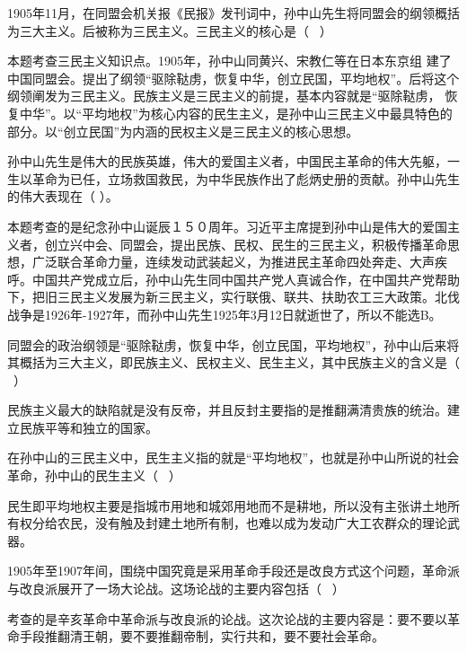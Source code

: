 \question 1905年11月，在同盟会机关报《民报》发刊词中，孙中山先生将同盟会的纲领概括为三大主义。后被称为三民主义。三民主义的核心是（
~）
\par{}
\begin{solution}本题考查三民主义知识点。1905年，孙中山同黄兴、宋教仁等在日本东京组
建了中国同盟会。提出了纲领``驱除鞑虏，恢复中华，创立民国，平均地权''。后将这个纲领阐发为三民主义。民族主义是三民主义的前提，基本内容就是``驱除鞑虏，
恢复中华''。以``平均地权''为核心内容的民生主义，是孙中山三民主义中最具特色的部分。以``创立民国''为内涵的民权主义是三民主义的核心思想。
\end{solution}
\question 孙中山先生是伟大的民族英雄，伟大的爱国主义者，中国民主革命的伟大先躯，一生以革命为已任，立场救国救民，为中华民族作出了彪炳史册的贡献。孙中山先生的伟大表现在（
）。
\par{}
\begin{solution}本题考查的是纪念孙中山诞辰１５０周年。习近平主席提到孙中山是伟大的爱国主义者，创立兴中会、同盟会，提出民族、民权、民生的三民主义，积极传播革命思想，广泛联合革命力量，连续发动武装起义，为推进民主革命四处奔走、大声疾呼。中国共产党成立后，孙中山先生同中国共产党人真诚合作，在中国共产党帮助下，把旧三民主义发展为新三民主义，实行联俄、联共、扶助农工三大政策。北伐战争是1926年-1927年，而孙中山先生1925年3月12日就逝世了，所以不能选B。
\end{solution}
\question 同盟会的政治纲领是``驱除鞑虏，恢复中华，创立民国，平均地权''，孙中山后来将其概括为三大主义，即民族主义、民权主义、民生主义，其中民族主义的含义是（
~）
\par{}
\begin{solution}民族主义最大的缺陷就是没有反帝，并且反封主要指的是推翻满清贵族的统治。建立民族平等和独立的国家。
\end{solution}
\question 在孙中山的三民主义中，民生主义指的就是``平均地权''，也就是孙中山所说的社会革命，孙中山的民生主义（
~）
\par{}
\begin{solution}民生即平均地权主要是指城市用地和城郊用地而不是耕地，所以没有主张讲土地所有权分给农民，没有触及封建土地所有制，也难以成为发动广大工农群众的理论武器。
\end{solution}
\question 1905年至1907年间，围绕中国究竟是采用革命手段还是改良方式这个问题，革命派与改良派展开了一场大论战。这场论战的主要内容包括（
~）
\par{}
\begin{solution}考查的是辛亥革命中革命派与改良派的论战。这次论战的主要内容是：要不要以革命手段推翻清王朝，要不要推翻帝制，实行共和，要不要社会革命。
\end{solution}
